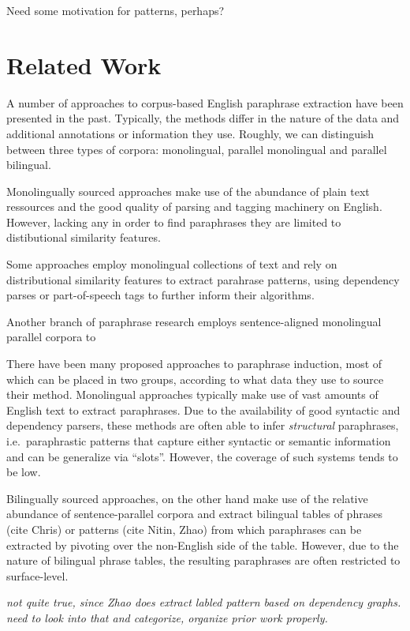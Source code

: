 \documentclass[11pt]{article}
\begin{document}
Need some motivation for patterns, perhaps?

\section{Related Work} \label{related_work}

A number of approaches to corpus-based English paraphrase extraction
have been presented in the past. Typically, the methods differ in the
nature of the data and additional annotations or information they
use. Roughly, we can distinguish between three types of corpora:
monolingual, parallel monolingual and parallel bilingual.

Monolingually sourced approaches make use of the abundance of plain
text ressources and the good quality of parsing and tagging machinery
on English. However, lacking any in order to find paraphrases they are
limited to distibutional similarity features.


Some approaches employ monolingual collections of text and rely on
distributional similarity features to extract parahrase patterns,
using dependency parses \cite{Lin2001} or part-of-speech tags
\cite{Bhagat2008} to further inform their algorithms.

Another branch of paraphrase research employs sentence-aligned
monolingual parallel corpora \cite{Barzilay2001,Quirk2004} to

There have been many proposed approaches to paraphrase induction, most
of which can be placed in two groups, according to what data they use
to source their method. Monolingual approaches typically make use of
vast amounts of English text to extract paraphrases. Due to the
availability of good syntactic and dependency parsers, these methods
are often able to infer \emph{structural} paraphrases, i.e.\
paraphrastic patterns that capture either syntactic or semantic
information and can be generalize via ``slots''. However, the coverage
of such systems tends to be low.

Bilingually sourced approaches, on the other hand make use of the
relative abundance of sentence-parallel corpora and extract bilingual
tables of phrases (cite Chris) or patterns (cite Nitin, Zhao) from
which paraphrases can be extracted by pivoting over the non-English
side of the table. However, due to the nature of bilingual phrase
tables, the resulting paraphrases are often restricted to
surface-level.

\emph{not quite true, since Zhao does extract labled pattern based on
  dependency graphs. need to look into that and categorize, organize
  prior work properly.}
\end{document}
